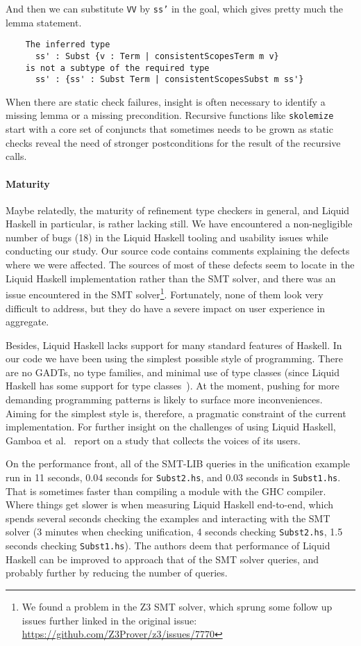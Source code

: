 \documentclass[sigconf, review]{acmart}
\newcommand{\tc}[1]{{\small\texttt{#1}}}
\begin{document}
And then we can substitute \tc{VV} by \tc{ss'} in the goal, which gives
pretty much the lemma statement.

\begin{verbatim}
    The inferred type
      ss' : Subst {v : Term | consistentScopesTerm m v}
    is not a subtype of the required type
      ss' : {ss' : Subst Term | consistentScopesSubst m ss'}
\end{verbatim}

When there are static check failures, insight is often necessary to identify
a missing lemma or a missing precondition.
Recursive functions like \tc{skolemize} start with a core
set of conjuncts that sometimes needs to be grown as static checks reveal the need of
stronger postconditions for the result of the recursive calls.

\paragraph{Maturity} Maybe relatedly, the maturity of refinement type checkers in general, and Liquid
Haskell in particular, is rather lacking still. We have encountered a
non-negligible number of bugs (18) in the Liquid Haskell tooling and usability issues
while conducting our study. Our source code contains comments explaining the defects
where we were affected.
The sources of most of these defects seem to locate in the Liquid Haskell
implementation rather than the SMT solver, and there was an issue encountered in the SMT
solver\footnote{We found a problem in the Z3 SMT solver, which sprung some follow up issues
further linked in the original issue: \url{https://github.com/Z3Prover/z3/issues/7770}}.
Fortunately, none of them look very
difficult to address, but they do have a severe impact on user experience in aggregate.

Besides, Liquid Haskell lacks support for many standard features of Haskell.
In our code we have been using the simplest possible style of programming.
There are no GADTs, no type families, and minimal use of type classes (since
Liquid Haskell has some support for type classes~\cite{liu20}). At the moment,
pushing for more demanding programming patterns is likely to surface more
inconveniences. Aiming for the simplest style is, therefore, a pragmatic constraint of
the current implementation. For further insight on the challenges of using Liquid Haskell,
Gamboa et al.~\cite{gamboa25} report on a study that collects the voices
of its users.

On the performance front, all of the SMT-LIB queries in the unification example run
in 11 seconds, 0.04 seconds for \tc{Subst2.hs}, and 0.03 seconds in \tc{Subst1.hs}.
That is sometimes faster than compiling a module with the GHC compiler.
Where things get slower is when measuring Liquid
Haskell end-to-end, which spends several seconds checking the examples and interacting with the
SMT solver (3 minutes when checking unification, 4 seconds checking \tc{Subst2.hs},
1.5 seconds checking \tc{Subst1.hs}). The authors deem that performance of Liquid Haskell
can be improved to approach that of the SMT solver queries, and probably further by
reducing the number of queries.
\end{document}
